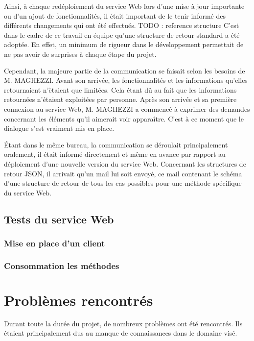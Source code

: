 Ainsi, \`a chaque red\'eploiement du service Web lors d'une mise \`a jour importante ou d'un ajout de fonctionnalit\'es, il \'etait important de le tenir inform\'e des diff\'erents changements qui ont \'et\'e effectu\'es.
TODO : reference structure
C'est dans le cadre de ce travail en \'equipe qu'une structure de retour standard a \'et\'e adopt\'ee.
En effet, un minimum de rigueur dans le d\'eveloppement permettait de ne pas avoir de surprises \`a chaque \'etape du projet.

Cependant, la majeure partie de la communication se faisait selon les besoins de M. MAGHEZZI.
Avant son arriv\'ee, les fonctionnalit\'es et les informations qu'elles retournaient n'\`etaient que limit\'ees.
Cela \'etant d\^u au fait que les informations retourn\'ees n'\'etaient exploit\'ees par personne.
Apr\`es son arriv\'ee et sa premi\`ere connexion au service Web, M. MAGHEZZI a commenc\'e \`a exprimer des demandes concernant les \'el\'ements qu'il aimerait voir appara\^itre.
C'est \`a ce moment que le dialogue s'est vraiment mis en place.

\'Etant dans le m\^eme bureau, la communication se d\'eroulait principalement oralement, il \'etait inform\'e directement et m\^eme en avance par rapport au d\'eploiement d'une nouvelle version du service Web.
Concernant les structures de retour JSON, il arrivait qu'un mail lui soit envoy\'e, ce mail contenant le sch\'ema d'une structure de retour de tous les cas possibles pour une m\'ethode sp\'ecifique du service Web.

\subsection{Tests du service Web}

\subsubsection{Mise en place d'un client}

\subsubsection{Consommation les m\'ethodes}


\section{Probl\`emes rencontr\'es}

Durant toute la dur\'ee du projet, de nombreux probl\`emes ont \'et\'e rencontr\'es.
Ils \'etaient principalement dus au manque de connaissances dans le domaine vis\'e.

